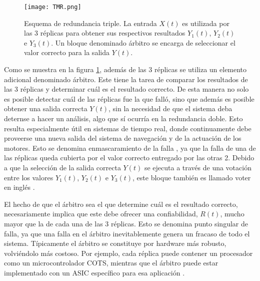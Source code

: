 \begin{figure}[htb]
    \centering
    \texttt{[image: TMR.png]}
    \caption{Esquema de redundancia triple. La entrada $X(t)$ es utilizada por las 3 réplicas para obtener sus respectivos resultados $Y_1(t)$, $Y_2(t)$ e $Y_3(t)$. Un bloque denominado árbitro se encarga de seleccionar el valor correcto para la salida $Y(t)$.}
    \label{fig:TMR}
\end{figure}



Como se muestra en la figura \ref{fig:TMR}, además de las 3 réplicas se utiliza un elemento adicional denominado árbitro. Este tiene la tarea de comparar los resultados de las 3 réplicas y determinar cuál es el resultado correcto. De esta manera no solo es posible detectar cuál de las réplicas fue la que falló, sino que además es posible obtener una salida correcta $Y(t)$, sin la necesidad de que el sistema deba deternse a hacer un análisis, algo que sí ocurría en la redundancia doble. Esto resulta especialmente útil en sistemas de tiempo real, donde continuamente debe proveerse una nueva salida del sistema de navegación y de la actuación de los motores. Esto se denomina enmascaramiento de la falla \cite{nelson1990fault}, ya que la falla de una de las réplicas queda cubierta por el valor correcto entregado por las otras 2. Debido a que la selección de la salida correcta $Y(t)$ se ejecuta a través de una votación entre los valores $Y_1(t)$, $Y_2(t)$ e $Y_3(t)$, este bloque también es llamado voter en inglés \cite{lyons1962use}.

El hecho de que el árbitro sea el que determine cuál es el resultado correcto, necesariamente implica que este debe ofrecer una confiabilidad, $R(t)$, mucho mayor que la de cada una de las 3 réplicas. Esto se denomina punto singular de falla, ya que una falla en el árbitro inevitablemente genera un fracaso de todo el sistema. Típicamente el árbitro se constituye por hardware más robusto, volviéndolo más costoso. Por ejemplo, cada réplica puede contener un procesador como un microcontrolador COTS, mientras que el árbitro puede estar implementado con un ASIC específico para esa aplicación \cite{hiergeist2017internal}.

